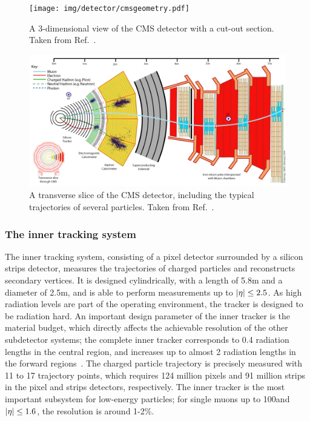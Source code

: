 \begin{figure}[hbtp]
  \begin{center}
    \texttt{[image: img/detector/cmsgeometry.pdf]}
    \caption{
        A 3-dimensional view of the CMS detector with a cut-out section.
        Taken from Ref.~\cite{Sakuma:2013jqa}.
        }
    \label{fig:cmsgeometry}
  \end{center}
\end{figure}


\begin{figure}[hbtp]
  \begin{center}
    \includegraphics[width=\linewidth]{img/detector/cmsslice.png}
    \caption{
        A transverse slice of the CMS detector, including the typical trajectories of several particles.
        Taken from Ref.~\cite{cmsslice}.
        }
    \label{fig:cmsslice}
  \end{center}
\end{figure}


\subsubsection{The inner tracking system}

The inner tracking system, consisting of a pixel detector surrounded by a silicon strips detector, measures the trajectories of charged particles and reconstructs secondary vertices.
% 
It is designed cylindrically, with a length of 5.8\unit{m} and a diameter of 2.5\unit{m}, and is able to perform measurements up to $\left| \eta \right | \leq 2.5$.
% 
As high radiation levels are part of the operating environment, the tracker is designed to be radiation hard.
%
An important design parameter of the inner tracker is the material budget, which directly affects the achievable resolution of the other subdetector systems; the complete inner tracker corresponds to 0.4 radiation lengths in the central region, and increases up to almost 2 radiation lengths in the forward regions~\cite{Chatrchyan:2008zzk}.
% 
The charged particle trajectory is precisely measured with 11 to 17 trajectory points, which requires 124 million pixels and 91 million strips in the pixel and strips detectors, respectively.
% 
The inner tracker is the most important subsystem for low-energy particles; for single muons up to 100\GeV and $\left| \eta \right | \leq 1.6$, the \pt resolution is around 1-2\%.


